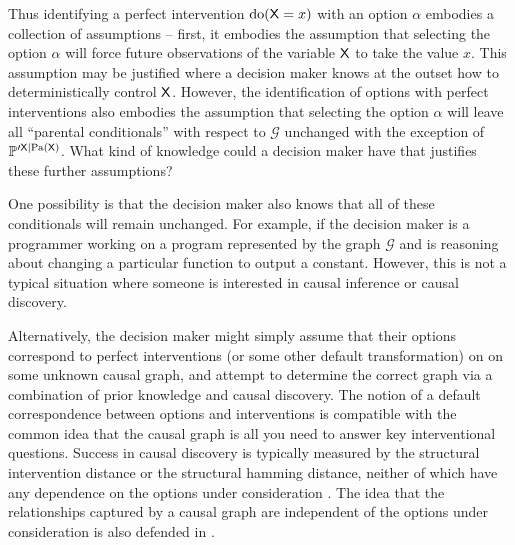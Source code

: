 \documentclass{article}
\begin{document}
Thus identifying a perfect intervention $\mathrm{do}(\mathsf{X}=x)$ with an option $\alpha$ embodies a collection of assumptions -- first, it embodies the assumption that selecting the option $\alpha$ will force future observations of the variable $\mathsf{X}$ to take the value $x$. This assumption may be justified where a decision maker knows at the outset how to deterministically control $\mathsf{X}$. However, the identification of options with perfect interventions also embodies the assumption that selecting the option $\alpha$ will leave all ``parental conditionals'' with respect to $\mathcal{G}$ unchanged with the exception of $\mathbb{P}^{\prime \mathsf{X}|\mathrm{Pa}(\mathsf{X})}$. What kind of knowledge could a decision maker have that justifies these further assumptions?

One possibility is that the decision maker also knows that all of these conditionals will remain unchanged. For example, if the decision maker is a programmer working on a program represented by the graph $\mathcal{G}$ and is reasoning about changing a particular function to output a constant. However, this is not a typical situation where someone is interested in causal inference or causal discovery.

Alternatively, the decision maker might simply assume that their options correspond to perfect interventions (or some other default transformation) on on some unknown causal graph, and attempt to determine the correct graph via a combination of prior knowledge and causal discovery. The notion of a default correspondence between options and interventions is compatible with the common idea that the causal graph is all you need to answer key interventional questions. Success in causal discovery is typically measured by the structural intervention distance \citep{peters_structural_2015} or the structural hamming distance, neither of which have any dependence on the options under consideration \citep{scherrer_learning_2022, toth_active_2022, brouillard_differentiable_2020, ngGraphAutoencoderApproach2019, forre_constraint-based_2018, zhengDAGsNOTEARS2018, chickering_optimal_2003, spirtes_causation_1993}. The idea that the relationships captured by a causal graph are independent of the options under consideration is also defended in \citet{pearl_does_2018}. 
\end{document}
